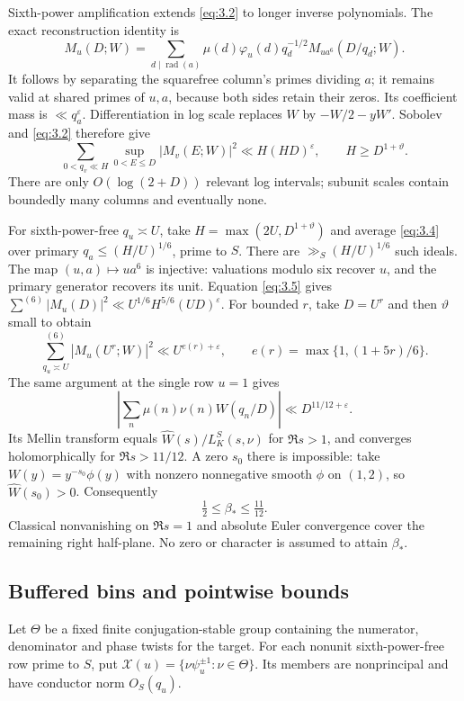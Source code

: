 \documentclass[11pt,a4paper]{article}
\begin{document}
Sixth-power amplification extends \eqref{eq:3.2} to longer inverse polynomials. The exact reconstruction identity is \[
 M_u(D;W)=\sum_{d\mid\operatorname{rad}(a)}
 \mu(d)\varphi_u(d)q_d^{-1/2}M_{ua^6}(D/q_d;W).
\tag{3.4}\label{eq:3.4}
\] It follows by separating the squarefree column's primes dividing \(a\); it remains valid at shared primes of \(u,a\), because both sides retain their zeros. Its coefficient mass is \(\ll q_a^\varepsilon\). Differentiation in log scale replaces \(W\) by \(-W/2-yW'\). Sobolev and \eqref{eq:3.2} therefore give \[
 \sum_{0<q_v\ll H}\sup_{0<E\le D}|M_v(E;W)|^2\ll H(HD)^\varepsilon,
 \qquad H\ge D^{1+\vartheta}.
\tag{3.5}\label{eq:3.5}
\] There are only \(O(\log(2+D))\) relevant log intervals; subunit scales contain boundedly many columns and eventually none.

For sixth-power-free \(q_u\asymp U\), take \(H=\max(2U,D^{1+\vartheta})\) and average \eqref{eq:3.4} over primary \(q_a\le(H/U)^{1/6}\), prime to \(S\). There are \(\gg_S(H/U)^{1/6}\) such ideals. The map \((u,a)\mapsto ua^6\) is injective: valuations modulo six recover \(u\), and the primary generator recovers its unit. Equation \eqref{eq:3.5} gives \(\sum^{(6)}|M_u(D)|^2\ll U^{1/6}H^{5/6}(UD)^\varepsilon\). For bounded \(r\), take \(D=U^r\) and then \(\vartheta\) small to obtain \[
 \sum_{q_u\asymp U}^{(6)}|M_u(U^r;W)|^2
 \ll U^{e(r)+\varepsilon},\qquad e(r)=\max\{1,(1+5r)/6\}.
\tag{3.6}\label{eq:3.6}
\] The same argument at the single row \(u=1\) gives \[
 \left|\sum_n\mu(n)\nu(n)W(q_n/D)\right|\ll D^{11/12+\varepsilon}.
\tag{3.7}\label{eq:3.7}
\] Its Mellin transform equals \(\widehat W(s)/L_K^S(s,\nu)\) for \(\Re s>1\), and converges holomorphically for \(\Re s>11/12\). A zero \(s_0\) there is impossible: take \(W(y)=y^{-s_0}\phi(y)\) with nonzero nonnegative smooth \(\phi\) on \((1,2)\), so \(\widehat W(s_0)>0\). Consequently \[
 \tfrac12\le\beta_*\le\tfrac{11}{12}.
\tag{3.8}\label{eq:3.8}
\] Classical nonvanishing on \(\Re s=1\) and absolute Euler convergence cover the remaining right half-plane. No zero or character is assumed to attain \(\beta_*\).

\subsection{Buffered bins and pointwise bounds}\label{sec:3.2}

Let \(\Theta\) be a fixed finite conjugation-stable group containing the numerator, denominator and phase twists for the target. For each nonunit sixth-power-free row prime to \(S\), put \(\mathcal X(u)=\{\nu\psi_u^{\pm1}:\nu\in\Theta\}\). Its members are nonprincipal and have conductor norm \(O_S(q_u)\).
\end{document}
